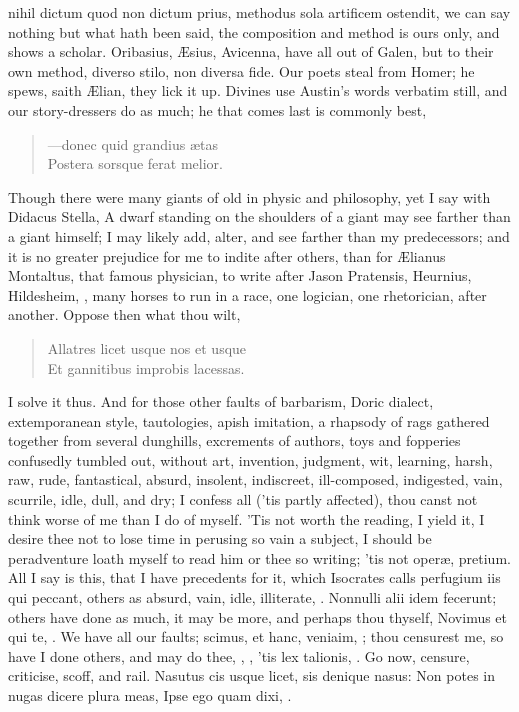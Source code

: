 {nihil dictum quod non dictum prius, methodus sola artificem ostendit,
we can say nothing but what hath been said, the composition and method
is ours only, and shows a scholar. Oribasius, \AE{}sius, Avicenna, have
all out of Galen, but to their own method, diverso stilo, non diversa
fide. Our poets steal from Homer; he spews, saith \AE{}lian, they lick it
up. Divines use Austin's words verbatim still, and our story-dressers
do as much; he that comes last is commonly best,
\begin{verse}
---\textlatin{donec quid grandius \ae{}tas}\\
\textlatin{Postera sorsque ferat melior}.
\end{verse}

Though there were many giants of old in physic and philosophy, yet I
say with Didacus Stella, A dwarf standing on the shoulders of a
giant may see farther than a giant himself; I may likely add, alter,
and see farther than my predecessors; and it is no greater prejudice
for me to indite after others, than for \AE{}lianus Montaltus, that famous
physician, to write  after Jason Pratensis, Heurnius,
Hildesheim, \etc, many horses to run in a race, one logician, one
rhetorician, after another. Oppose then what thou wilt,
\begin{verse}
\textlatin{Allatres licet usque nos et usque}\\
\textlatin{Et gannitibus improbis lacessas.}\\
\end{verse}

I solve it thus. And for those other faults of barbarism, Doric
dialect, extemporanean style, tautologies, apish imitation, a rhapsody
of rags gathered together from several dunghills, excrements of
authors, toys and fopperies confusedly tumbled out, without art,
invention, judgment, wit, learning, harsh, raw, rude, fantastical,
absurd, insolent, indiscreet, ill-composed, indigested, vain, scurrile,
idle, dull, and dry; I confess all ('tis partly affected), thou canst
not think worse of me than I do of myself. 'Tis not worth the reading,
I yield it, I desire thee not to lose time in perusing so vain a
subject, I should be peradventure loath myself to read him or thee so
writing; 'tis not oper\ae{}, pretium. All I say is this, that I have
precedents for it, which Isocrates calls perfugium iis qui
peccant, others as absurd, vain, idle, illiterate, \etc. Nonnulli alii
idem fecerunt; others have done as much, it may be more, and perhaps
thou thyself, Novimus et qui te, \etc. We have all our faults; scimus, et
hanc, veniaim, \etc; thou censurest me, so have I done others, and
may do thee, , \etc, 'tis lex talionis, .
Go now, censure, criticise, scoff, and rail.
Nasutus cis usque licet, sis denique nasus:
Non potes in nugas dicere plura meas,
Ipse ego quam dixi, \etc.

}
